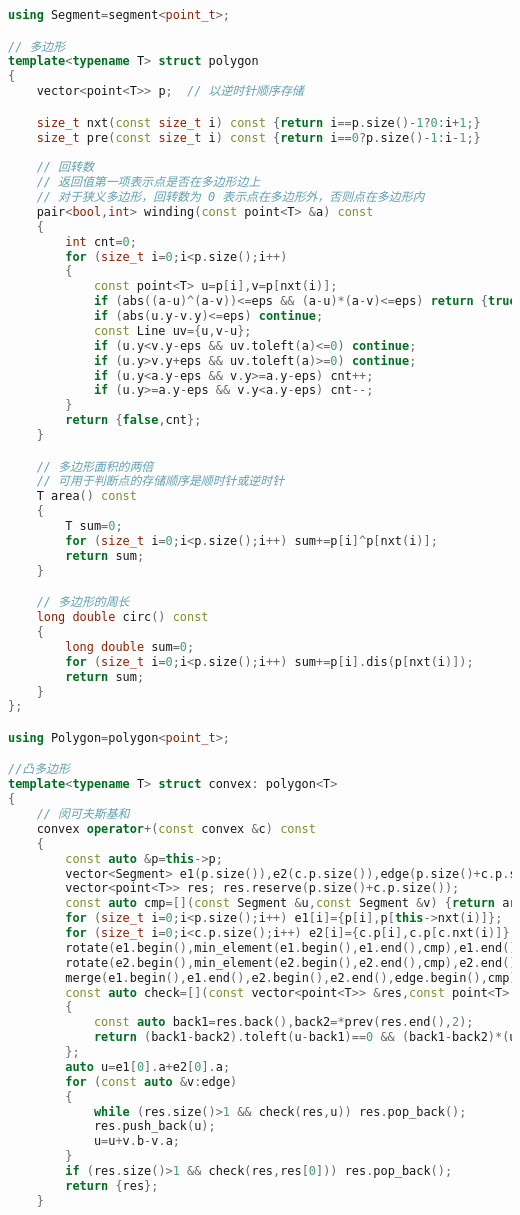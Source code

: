 \documentclass[a4paper]{book}
\begin{document}
\begin{lstlisting}[language=c++]
using Segment=segment<point_t>;

// 多边形
template<typename T> struct polygon
{
    vector<point<T>> p;  // 以逆时针顺序存储

    size_t nxt(const size_t i) const {return i==p.size()-1?0:i+1;}
    size_t pre(const size_t i) const {return i==0?p.size()-1:i-1;}
    
    // 回转数
    // 返回值第一项表示点是否在多边形边上
    // 对于狭义多边形，回转数为 0 表示点在多边形外，否则点在多边形内
    pair<bool,int> winding(const point<T> &a) const
    {
        int cnt=0;
        for (size_t i=0;i<p.size();i++)
        {
            const point<T> u=p[i],v=p[nxt(i)];
            if (abs((a-u)^(a-v))<=eps && (a-u)*(a-v)<=eps) return {true,0};
            if (abs(u.y-v.y)<=eps) continue;
            const Line uv={u,v-u};
            if (u.y<v.y-eps && uv.toleft(a)<=0) continue;
            if (u.y>v.y+eps && uv.toleft(a)>=0) continue;
            if (u.y<a.y-eps && v.y>=a.y-eps) cnt++;
            if (u.y>=a.y-eps && v.y<a.y-eps) cnt--;
        }
        return {false,cnt};
    }

    // 多边形面积的两倍
    // 可用于判断点的存储顺序是顺时针或逆时针
    T area() const
    {
        T sum=0;
        for (size_t i=0;i<p.size();i++) sum+=p[i]^p[nxt(i)];
        return sum;
    }

    // 多边形的周长
    long double circ() const
    {
        long double sum=0;
        for (size_t i=0;i<p.size();i++) sum+=p[i].dis(p[nxt(i)]);
        return sum;
    }
};

using Polygon=polygon<point_t>;

//凸多边形
template<typename T> struct convex: polygon<T>
{
    // 闵可夫斯基和
    convex operator+(const convex &c) const  
    {
        const auto &p=this->p;
        vector<Segment> e1(p.size()),e2(c.p.size()),edge(p.size()+c.p.size());
        vector<point<T>> res; res.reserve(p.size()+c.p.size());
        const auto cmp=[](const Segment &u,const Segment &v) {return argcmp()(u.b-u.a,v.b-v.a);};
        for (size_t i=0;i<p.size();i++) e1[i]={p[i],p[this->nxt(i)]};
        for (size_t i=0;i<c.p.size();i++) e2[i]={c.p[i],c.p[c.nxt(i)]};
        rotate(e1.begin(),min_element(e1.begin(),e1.end(),cmp),e1.end());
        rotate(e2.begin(),min_element(e2.begin(),e2.end(),cmp),e2.end());
        merge(e1.begin(),e1.end(),e2.begin(),e2.end(),edge.begin(),cmp);
        const auto check=[](const vector<point<T>> &res,const point<T> &u)
        {
            const auto back1=res.back(),back2=*prev(res.end(),2);
            return (back1-back2).toleft(u-back1)==0 && (back1-back2)*(u-back1)>=-eps;
        };
        auto u=e1[0].a+e2[0].a;
        for (const auto &v:edge)
        {
            while (res.size()>1 && check(res,u)) res.pop_back();
            res.push_back(u);
            u=u+v.b-v.a;
        }
        if (res.size()>1 && check(res,res[0])) res.pop_back();
        return {res};
    }


\end{lstlisting}
\end{document}
